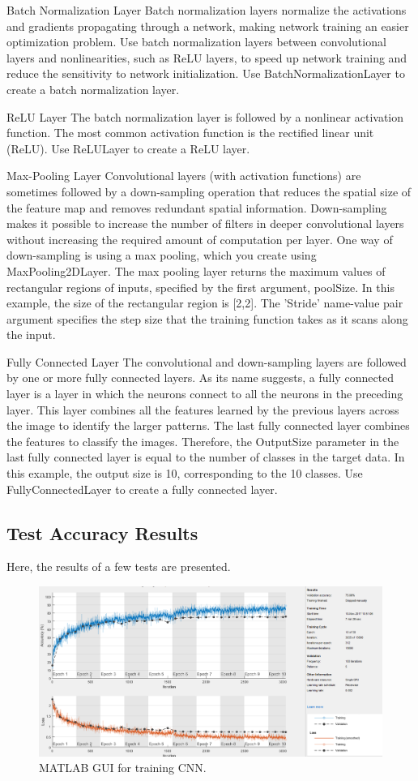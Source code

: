 Batch Normalization Layer Batch normalization layers normalize the activations and gradients propagating through a network, making network training an easier optimization problem. Use batch normalization layers between convolutional layers and nonlinearities, such as ReLU layers, to speed up network training and reduce the sensitivity to network initialization. Use BatchNormalizationLayer to create a batch normalization layer.

ReLU Layer The batch normalization layer is followed by a nonlinear activation function. The most common activation function is the rectified linear unit (ReLU). Use ReLULayer to create a ReLU layer.

Max-Pooling Layer Convolutional layers (with activation functions) are sometimes followed by a down-sampling operation that reduces the spatial size of the feature map and removes redundant spatial information. Down-sampling makes it possible to increase the number of filters in deeper convolutional layers without increasing the required amount of computation per layer. One way of down-sampling is using a max pooling, which you create using MaxPooling2DLayer. The max pooling layer returns the maximum values of rectangular regions of inputs, specified by the first argument, poolSize. In this example, the size of the rectangular region is [2,2]. The 'Stride' name-value pair argument specifies the step size that the training function takes as it scans along the input.

Fully Connected Layer The convolutional and down-sampling layers are followed by one or more fully connected layers. As its name suggests, a fully connected layer is a layer in which the neurons connect to all the neurons in the preceding layer. This layer combines all the features learned by the previous layers across the image to identify the larger patterns. The last fully connected layer combines the features to classify the images. Therefore, the OutputSize parameter in the last fully connected layer is equal to the number of classes in the target data. In this example, the output size is 10, corresponding to the 10 classes. Use FullyConnectedLayer to create a fully connected layer.


\subsection{Test Accuracy Results}

Here, the results of a few tests are presented.

\begin{figure}[h!]
	\centering
	\includegraphics[width=\textwidth]{images/CNNTrain}
	\caption{MATLAB GUI for training CNN.}
	\label{fig:CNNTrain}
\end{figure}



    
